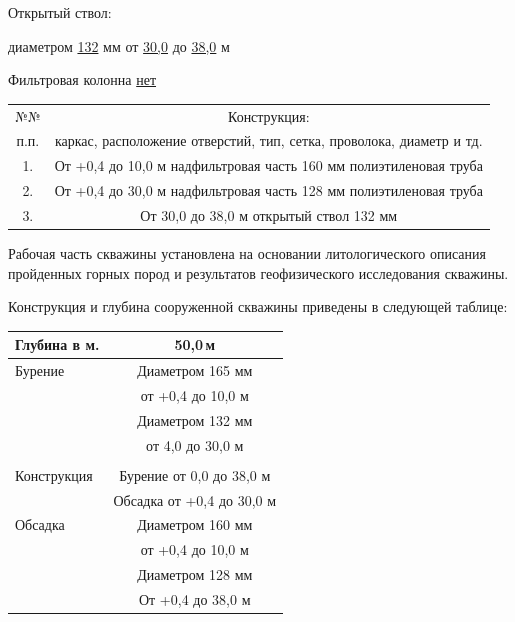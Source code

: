 \documentclass[a4paper,12pt]{article} %
\DeclareRobustCommand{\diameter}{%
	\text{\usefont{LS1}{stixscr}{m}{n}\symbol{"60}}%
}
\newcommand{\txtDepth}{50,0}						%
\begin{document}
	\bigskip

	Открытый ствол:

	 диаметром \underline{132} мм от \underline{30,0} до \underline{38,0} м 
    
    \bigskip
	
	Фильтровая колонна \underline{нет}
	
	\bigskip

\begin{tabular}{|c|c|}
	\hline 
	\rule[-1ex]{0pt}{2.5ex} №№ & Конструкция: \\ 
	\rule[-1ex]{0pt}{2.5ex} п.п. & каркас, расположение отверстий, тип, сетка, проволока, диаметр и тд. \\ 
	\hline 
	\rule[-1ex]{0pt}{2.5ex} 1. & От +0,4 до 10,0 м   надфильтровая часть \diameter 160 мм полиэтиленовая труба \\ 
	\hline 
	\rule[-1ex]{0pt}{2.5ex} 2. & От +0,4 до 30,0 м   надфильтровая часть \diameter 128 мм полиэтиленовая труба \\ 
	\hline 
	\rule[-1ex]{0pt}{2.5ex} 3. & От 30,0 до 38,0 м   открытый ствол \diameter 132 мм \\ 
	\hline 
\end{tabular} 

\bigskip

Рабочая часть скважины установлена на основании литологического описания пройденных горных пород и результатов геофизического исследования скважины.


Конструкция и глубина сооруженной скважины приведены в следующей таблице:

\bigskip

\begin{center}
\begin{tabular}{|l|c|}
	\hline 
	Глубина в м. & \txtDepth \,м \\ 
	\hline 
	Бурение & Диаметром 165 мм \\ 
	& от +0,4 до 10,0 м \\ 
	& Диаметром 132 мм \\ 
	& от 4,0 до 30,0 м \\ 
	&  \\ 
	\hline 
	Конструкция & Бурение от 0,0 до 38,0 м \\ 
	& Обсадка от +0,4 до 30,0 м \\ 
	\hline 
	Обсадка & Диаметром 160 мм \\ 
	& от +0,4 до 10,0 м \\ 
	& Диаметром 128 мм  \\ 
	& От +0,4 до 38,0 м \\ 
	\hline 
\end{tabular} 
\end{center}
\end{document}
